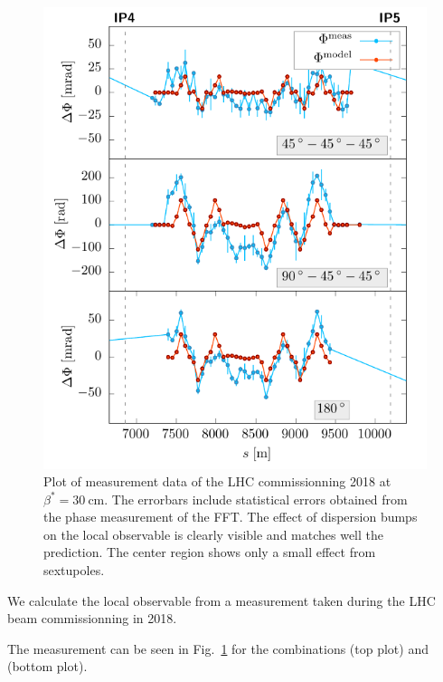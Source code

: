 \begin{figure}[t]
  \centering
  \includegraphics[width=.8\linewidth]{meas}
  \caption{Plot of measurement data of the LHC commissionning 2018 at $\beta^*=\SI{30}{\centi\metre}$.
    The errorbars include statistical errors
    obtained from the phase measurement of the FFT.
    The effect of dispersion bumps on the local observable is clearly visible and matches well the
    prediction. The center region shows only a small effect from sextupoles.
  }
  \label{fig_measlobster002}
\end{figure}
%
We calculate the local observable from a measurement taken during the LHC beam commissionning in 2018.

The measurement can be seen in Fig.~\ref{fig_measlobster002} for the combinations 
(top plot) and  (bottom plot).

